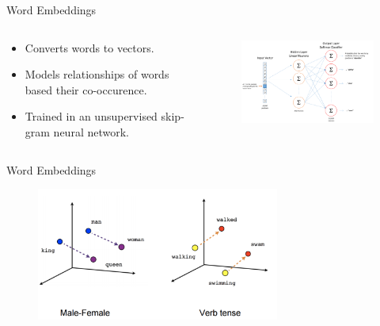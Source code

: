 \documentclass[aspectratio=169, 11pt]{beamer}
\begin{document}
\begin{frame}{Word Embeddings}
  \begin{columns}
    \begin{column}{0.5\textwidth}
      \begin{itemize}
        \item Converts words to vectors.
        \item Models relationships of words based their co-occurence.
        \item Trained in an unsupervised skip-gram neural network.
      \end{itemize}
    \end{column}
    \begin{column}{0.5\textwidth}
      \begin{figure}[!ht]
        \centering
        \includegraphics[width=80mm]{diagrams/presentation/word2vec_chris.png}
        \end{figure}
    \end{column}
  \end{columns}
\end{frame}


\begin{frame}{Word Embeddings}
  \begin{figure}[!ht]
    \centering
    \includegraphics[width=80mm]{diagrams/presentation/word2vec_example.png}
    \end{figure}
\end{frame}
\end{document}
